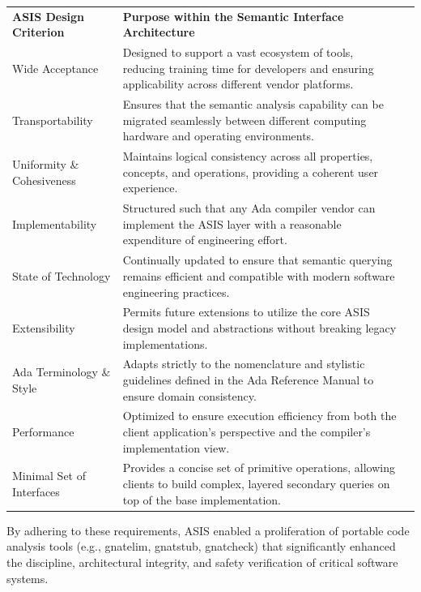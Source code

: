 \documentclass[11pt,letterpaper]{article}
\newcommand{\headingfont}{\sffamily}
\begin{document}
\begin{multicols*}{2}
\begingroup
\renewcommand{\arraystretch}{1.5}
\begin{tabularx}{\columnwidth}{@{}P{0.3\columnwidth}YY@{}}
    \headingfont\bfseries ASIS Design Criterion & \headingfont\bfseries Purpose within the Semantic Interface Architecture \\
    \addlinespace[4pt]
    Wide Acceptance & Designed to support a vast ecosystem of tools, reducing training time for developers and ensuring applicability across different vendor platforms. \\
    \addlinespace[4pt]
    Transportability & Ensures that the semantic analysis capability can be migrated seamlessly between different computing hardware and operating environments. \\
    \addlinespace[4pt]
    Uniformity \& Cohesiveness & Maintains logical consistency across all properties, concepts, and operations, providing a coherent user experience. \\
    \addlinespace[4pt]
    Implementability & Structured such that any Ada compiler vendor can implement the ASIS layer with a reasonable expenditure of engineering effort. \\
    \addlinespace[4pt]
    State of Technology & Continually updated to ensure that semantic querying remains efficient and compatible with modern software engineering practices. \\
    \addlinespace[4pt]
    Extensibility & Permits future extensions to utilize the core ASIS design model and abstractions without breaking legacy implementations. \\
    \addlinespace[4pt]
    Ada Terminology \& Style & Adapts strictly to the nomenclature and stylistic guidelines defined in the Ada Reference Manual to ensure domain consistency. \\
    \addlinespace[4pt]
    Performance & Optimized to ensure execution efficiency from both the client application's perspective and the compiler's implementation view. \\
    \addlinespace[4pt]
    Minimal Set of Interfaces & Provides a concise set of primitive operations, allowing clients to build complex, layered secondary queries on top of the base implementation. \\
\end{tabularx}
\label{tab:table3}
\endgroup
By adhering to these requirements, ASIS enabled a proliferation of portable code analysis tools (e.g., gnatelim, gnatstub, gnatcheck) that significantly enhanced the discipline, architectural integrity, and safety verification of critical software systems.


\end{multicols*}
\end{document}
